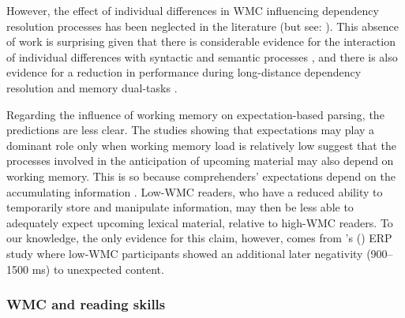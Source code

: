 \documentclass{frontiersSCNS}\usepackage{knitr}
\newcommand{\posscitet}[1]{\citeauthor{#1}'s (\citeyear{#1})}
\begin{document}
However, the effect of individual differences in WMC influencing dependency resolution processes has been neglected in the literature (but see: \citealp{VanDykeEtAl2014}). This absence of work is surprising given that there is considerable evidence for the interaction of individual differences with syntactic and semantic processes \citep{JustCarpenter1992,PearlmutterMacDonald1995,TraxlerEtAl2005,vonderMalsburgVasishth2012,TraxlerEtAl2012}, and there is also evidence for a reduction in performance during long-distance dependency resolution and memory dual-tasks \citep{FedorenkoEtAl2006,FedorenkoEtAl2013}. 




Regarding the influence of working memory on expectation-based parsing, the predictions are less clear. The studies showing that expectations may play a dominant role only when working memory load is relatively low \citep{Levy2008,LevyKeller2012,HusainEtAl2014} suggest that  the processes involved in the anticipation of upcoming material may also depend on working memory. This is so because comprehenders' expectations depend on the accumulating information \citep{Levy2008}. Low-WMC readers, who have a reduced ability to temporarily store and manipulate information, may then be less able to adequately expect upcoming lexical material, relative to high-WMC readers.  To our knowledge, the only evidence for this claim, however, comes from \posscitet{OttenVanBerkum2009} ERP study where low-WMC participants showed an additional later negativity (900–1500 ms) to unexpected content.

\subsubsection{WMC and reading skills} 
\end{document}
